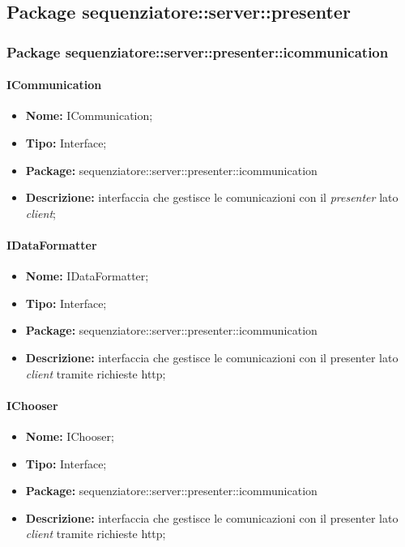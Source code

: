 \subsection{Package sequenziatore::server::presenter}
\subsubsection{Package sequenziatore::server::presenter::icommunication}
\paragraph{ICommunication}
	\begin{itemize}
		\item \textbf{Nome:} ICommunication;
		\item \textbf{Tipo:} Interface;
		\item \textbf{Package:} sequenziatore::server::presenter::icommunication
		\item \textbf{Descrizione:} interfaccia che gestisce le comunicazioni con il \textit{presenter} lato \textit{client};
	\end{itemize}
\paragraph{IDataFormatter}
	\begin{itemize}
		\item \textbf{Nome:} IDataFormatter;
		\item \textbf{Tipo:} Interface;
		\item \textbf{Package:} sequenziatore::server::presenter::icommunication
		\item \textbf{Descrizione:} interfaccia che gestisce le comunicazioni con il presenter lato \textit{client} tramite richieste http;
	\end{itemize}

\paragraph{IChooser}
	\begin{itemize}
		\item \textbf{Nome:} IChooser;
		\item \textbf{Tipo:} Interface;
		\item \textbf{Package:} sequenziatore::server::presenter::icommunication
		\item \textbf{Descrizione:} interfaccia che gestisce le comunicazioni con il presenter lato \textit{client} tramite richieste http;
	\end{itemize}
